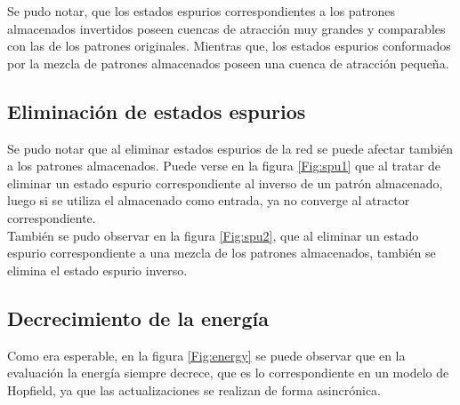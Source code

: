 \documentclass{article}
\begin{document}
 Se pudo notar, que los estados espurios correspondientes a los patrones almacenados invertidos poseen cuencas de atracción muy grandes
 y comparables con las de los patrones originales. Mientras que, los estados espurios conformados por la mezcla de patrones almacenados
 poseen una cuenca de atracción pequeña.
 
 \subsection{Eliminación de estados espurios}
 Se pudo notar que al eliminar estados espurios de la red se puede afectar también a los patrones almacenados. Puede verse en la figura 
 \ref{Fig:spu1} que al tratar de eliminar un estado espurio correspondiente al inverso de un patrón almacenado, luego si se utiliza
 el almacenado como entrada, ya no converge al atractor correspondiente.\\
 
 También se pudo observar en la figura \ref{Fig:spu2}, que al eliminar un estado espurio correspondiente a una mezcla de los patrones almacenados, también se elimina
 el estado espurio inverso.
 
 \subsection{Decrecimiento de la energía}
 Como era esperable, en la figura \ref{Fig:energy} se puede observar que en la evaluación la energía siempre decrece, que es lo correspondiente en
 un modelo de Hopfield, ya que las actualizaciones se realizan de forma asincrónica.
 
\end{document}
